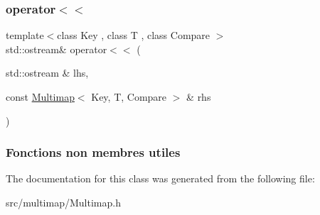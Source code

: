 \subsubsection{\texorpdfstring{operator$<$$<$}{operator<<}}
{\footnotesize\ttfamily template$<$class Key , class T , class Compare $>$ \\
std\+::ostream\& operator$<$$<$ (\begin{DoxyParamCaption}\item[{std\+::ostream \&}]{lhs,  }\item[{const \hyperlink{classMultimap}{Multimap}$<$ Key, T, Compare $>$ \&}]{rhs }\end{DoxyParamCaption})\hspace{0.3cm}{\ttfamily [friend]}}

\subsubsection*{Fonctions non membres utiles }

The documentation for this class was generated from the following file\+:\begin{DoxyCompactItemize}
\item 
src/multimap/Multimap.\+h\end{DoxyCompactItemize}
